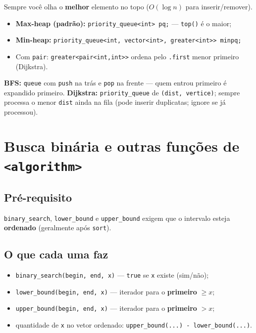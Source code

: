 Sempre você olha o \textbf{melhor} elemento no topo ($O(\log n)$ para inserir/remover).

\begin{itemize}[nosep]
  \item \textbf{Max-heap (padrão):} \texttt{priority\_queue<int> pq;} --- \texttt{top()} é o maior;
  \item \textbf{Min-heap:} \texttt{priority\_queue<int, vector<int>, greater<int>> minpq;}
  \item Com \texttt{pair}: \texttt{greater<pair<int,int>>} ordena pelo \texttt{.first} menor primeiro (Dijkstra).
\end{itemize}

\begin{exemplodiabox}
\textbf{BFS:} \texttt{queue} com \texttt{push} na trás e \texttt{pop} na frente --- quem entrou primeiro é expandido primeiro. \textbf{Dijkstra:} \texttt{priority\_queue} de \texttt{(dist, vertice)}; sempre processa o menor \texttt{dist} ainda na fila (pode inserir duplicatas; ignore se já processou).
\end{exemplodiabox}


\section{Busca binária e outras funções de \texttt{<algorithm>}}

\subsection{Pré-requisito}

\texttt{binary\_search}, \texttt{lower\_bound} e \texttt{upper\_bound} exigem que o intervalo esteja \textbf{ordenado} (geralmente após \texttt{sort}).

\subsection{O que cada uma faz}

\begin{itemize}[nosep]
  \item \texttt{binary\_search(begin, end, x)} --- \texttt{true} se \texttt{x} existe (sim/não);
  \item \texttt{lower\_bound(begin, end, x)} --- iterador para o \textbf{primeiro} $\geq x$;
  \item \texttt{upper\_bound(begin, end, x)} --- iterador para o \textbf{primeiro} $> x$;
  \item quantidade de \texttt{x} no vetor ordenado: \texttt{upper\_bound(...) - lower\_bound(...)}.
\end{itemize}

